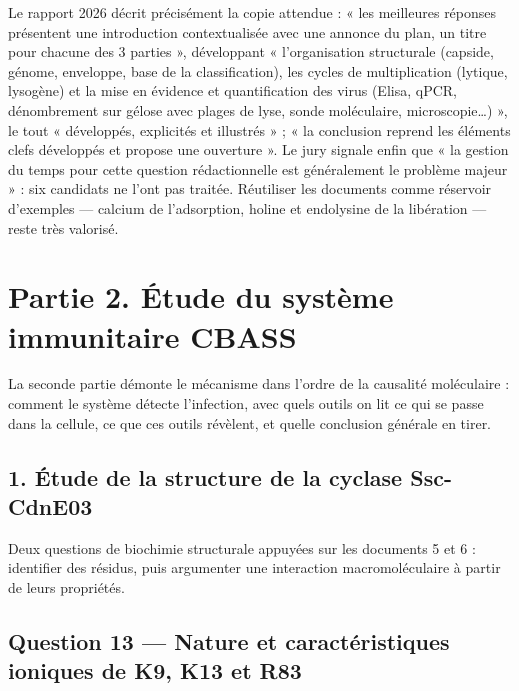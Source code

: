 \documentclass[11pt,a4paper]{article}
\begin{document}
\begin{jury}

Le rapport 2026 décrit précisément la copie attendue : « les meilleures réponses présentent une introduction contextualisée avec une annonce du plan, un titre pour chacune des 3 parties », développant « l'organisation structurale (capside, génome, enveloppe, base de la classification), les cycles de multiplication (lytique, lysogène) et la mise en évidence et quantification des virus (Elisa, qPCR, dénombrement sur gélose avec plages de lyse, sonde moléculaire, microscopie\ldots) », le tout « développés, explicités et illustrés » ; « la conclusion reprend les éléments clefs développés et propose une ouverture ». Le jury signale enfin que « la gestion du temps pour cette question rédactionnelle est généralement le problème majeur » : six candidats ne l'ont pas traitée. Réutiliser les documents comme réservoir d'exemples --- calcium de l'adsorption, holine et endolysine de la libération --- reste très valorisé.

\end{jury}

\hypertarget{partie-2.-uxe9tude-du-systuxe8me-immunitaire-cbass}{%
\section{Partie 2. Étude du système immunitaire CBASS}\label{partie-2.-uxe9tude-du-systuxe8me-immunitaire-cbass}}

La seconde partie démonte le mécanisme dans l'ordre de la causalité moléculaire : comment le système détecte l'infection, avec quels outils on lit ce qui se passe dans la cellule, ce que ces outils révèlent, et quelle conclusion générale en tirer.

\hypertarget{uxe9tude-de-la-structure-de-la-cyclase-ssc-cdne03}{%
\subsection{1. Étude de la structure de la cyclase Ssc-CdnE03}\label{uxe9tude-de-la-structure-de-la-cyclase-ssc-cdne03}}

Deux questions de biochimie structurale appuyées sur les documents 5 et 6 : identifier des résidus, puis argumenter une interaction macromoléculaire à partir de leurs propriétés.

\hypertarget{question-13-nature-et-caractuxe9ristiques-ioniques-de-k9-k13-et-r83}{%
\subsection{Question 13 --- Nature et caractéristiques ioniques de K9, K13 et R83}\label{question-13-nature-et-caractuxe9ristiques-ioniques-de-k9-k13-et-r83}}
\end{document}
